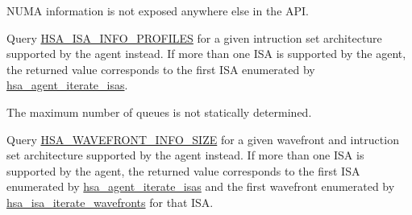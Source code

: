 \begin{DoxyRefList}
\item[Member \mbox{\hyperlink{group__agentinfo_gga39d0684207d95717d96319573b3e4a42a7e08d2bf6acfce669da4e810d3f7f28a}{HSA\+\_\+\+AGENT\+\_\+\+INFO\+\_\+\+NODE}} ]\label{deprecated__deprecated000071}%
%
NUMA information is not exposed anywhere else in the API. 
\item[Member \mbox{\hyperlink{group__agentinfo_gga39d0684207d95717d96319573b3e4a42acc8a260a87cb3fb811e29b8b13fabc4f}{HSA\+\_\+\+AGENT\+\_\+\+INFO\+\_\+\+PROFILE}} ]\label{deprecated__deprecated000060}%
%
Query \mbox{\hyperlink{group__instruction-set-architecture_ggaa8a09719dffad53bb3908b11ed25c1e4acdb85a23d05ef213bbbe041f5d49d6ec}{HSA\+\_\+\+ISA\+\_\+\+INFO\+\_\+\+PROFILES}} for a given intruction set architecture supported by the agent instead. If more than one ISA is supported by the agent, the returned value corresponds to the first ISA enumerated by \mbox{\hyperlink{group__instruction-set-architecture_gaa624c390f2cfec064bc1b4d9c9303ed4}{hsa\+\_\+agent\+\_\+iterate\+\_\+isas}}. 
\item[Member \mbox{\hyperlink{group__agentinfo_gga39d0684207d95717d96319573b3e4a42a06ac2144155abb87646396b0ac2c61f4}{HSA\+\_\+\+AGENT\+\_\+\+INFO\+\_\+\+QUEUES\+\_\+\+MAX}} ]\label{deprecated__deprecated000070}%
%
The maximum number of queues is not statically determined. 
\item[Member \mbox{\hyperlink{group__agentinfo_gga39d0684207d95717d96319573b3e4a42a2474a5a57ecbf494156769f408ded8fd}{HSA\+\_\+\+AGENT\+\_\+\+INFO\+\_\+\+WAVEFRONT\+\_\+\+SIZE}} ]\label{deprecated__deprecated000064}%
%
Query \mbox{\hyperlink{group__instruction-set-architecture_gga18048e15c5756d68df8b66ddfd0b1754a8e1b3070a581459b9b1417dcaa8b0641}{HSA\+\_\+\+WAVEFRONT\+\_\+\+INFO\+\_\+\+SIZE}} for a given wavefront and intruction set architecture supported by the agent instead. If more than one ISA is supported by the agent, the returned value corresponds to the first ISA enumerated by \mbox{\hyperlink{group__instruction-set-architecture_gaa624c390f2cfec064bc1b4d9c9303ed4}{hsa\+\_\+agent\+\_\+iterate\+\_\+isas}} and the first wavefront enumerated by \mbox{\hyperlink{group__instruction-set-architecture_gab06dc0d43c91a75a9e14bf52d9be1079}{hsa\+\_\+isa\+\_\+iterate\+\_\+wavefronts}} for that ISA. 
\item[Member \mbox{\hyperlink{group__agentinfo_gga39d0684207d95717d96319573b3e4a42a595eea133327c6c6110c02a0661a06d6}{HSA\+\_\+\+AGENT\+\_\+\+INFO\+\_\+\+WORKGROUP\+\_\+\+MAX\+\_\+\+DIM}} ]\label{deprecated__deprecated000065}%

\end{DoxyRefList}
